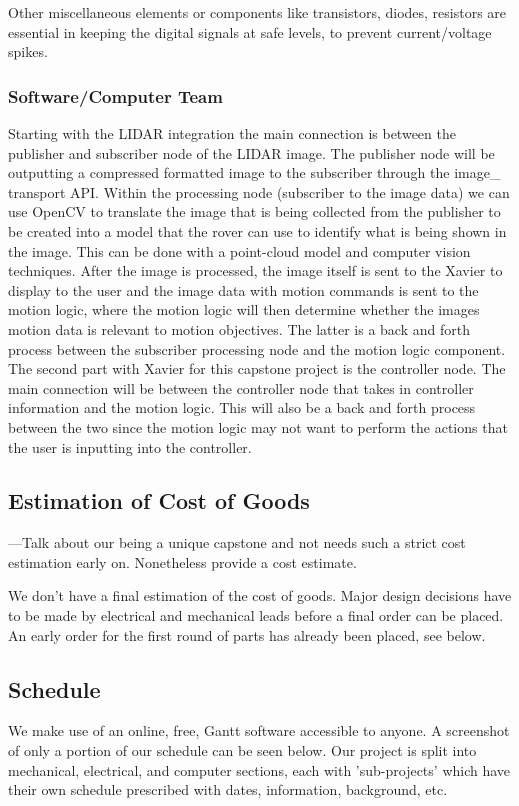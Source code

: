 \documentclass[a4paper, 10pt]{article}
\begin{document}
		Other miscellaneous elements or components like transistors, diodes, resistors are essential in keeping the digital signals at safe levels, to prevent current/voltage spikes.
		

		\subsubsection{Software/Computer Team}
	
Starting with the LIDAR integration the main connection is between the publisher and subscriber node of the LIDAR image. The publisher node will be outputting a compressed formatted image to the subscriber through the image\_ transport API. Within the processing node (subscriber to the image data) we can use OpenCV to translate the image that is being collected from the publisher to be created into a model that the rover can use to identify what is being shown in the image. This can be done with a point-cloud model and computer vision techniques. After the image is processed, the image itself is sent to the Xavier to display to the user and the image data with motion commands is sent to the motion logic, where the motion logic will then determine whether the images motion data is relevant to motion objectives. The latter is a back and forth process between the subscriber processing node and the motion logic component. 
The second part with Xavier for this capstone project is the controller node. The main connection will be between the controller node that takes in controller information and the motion logic. This will also be a back and forth process between the two since the motion logic may not want to perform the actions that the user is inputting into the controller. 

	\subsection{Estimation of Cost of Goods}
	---Talk about our being a unique capstone and not  needs such a strict cost estimation early on. Nonetheless provide a cost estimate.
	
	We don't have a final estimation of the cost of goods. Major design decisions have to be made by electrical and mechanical leads before a final order can be placed. An early order for the first round of parts has already been placed, see below. 

	\subsection{Schedule}
	We make use of an online, free, Gantt software accessible to anyone. A screenshot of only a portion of our schedule can be seen below. Our project is split into mechanical, electrical, and computer sections, each with 'sub-projects' which have their own schedule prescribed with dates, information, background, etc.
\end{document}
